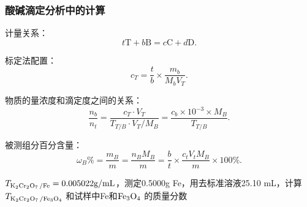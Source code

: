 \subsubsection{酸碱滴定分析中的计算}%
\label{subsub:酸碱滴定分析中的计算}
计量关系：
\[
    t \text{T}+b \text{B}=c \text{C}+ d \text{D}
.\] 
 
\begin{notation}
    标定法配置：
    \[
        c_T=\frac{t}{b} \times \frac{m_b}{M_bV_T} 
    .\] 
\end{notation}
\begin{notation}
    物质的量浓度和滴定度之间的关系：
    \[
        \frac{n_b}{n_t} =\frac{c_T\cdot V_T}{T_{T/B}\cdot V_T/M_B} =\frac{c_b\times 10^{-3}\times M_B}{T_{T /B}} 
    .\] 
\end{notation}
\begin{notation}
    被测组分百分含量：
    \[
        \omega_B\%=\frac{m_B}{m} =\frac{n_BM_B}{m} =\frac{b}{t} \times \frac{c_tV_tM_B}{m} \times 100\%
    .\] 
\end{notation}
\begin{eg}
    $T_{\ce{K_2Cr_2O_7 /Fe}}=0.005022\text{g/mL}$，测定0.5000g Fe，用去标准溶液25.10 mL，计算 $T_{\ce{K_2Cr_2O_7 /Fe_3O_4}}$ 和试样中Fe和$\ce{Fe_3O_4}$ 的质量分数
\end{eg}
